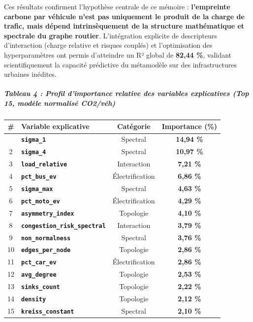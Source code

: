 \documentclass[10pt, a4paper]{article}
\newcounter{none}
\begin{document}
Ces résultats confirment l'hypothèse centrale de ce mémoire :
\textbf{l'empreinte carbone par véhicule n'est pas uniquement le produit
de la charge de trafic, mais dépend intrinsèquement de la structure
mathématique et spectrale du graphe routier}. L'intégration explicite de
descripteurs d'interaction (charge relative et risques couplés) et
l'optimisation des hyperparamètres ont permis d'atteindre un R² global
de \textbf{82,44 \%}, validant scientifiquement la capacité prédictive
du métamodèle sur des infrastructures urbaines inédites.

\subparagraph{Tableau 4 : Profil d'importance relative des variables
explicatives (Top 15, modèle normalisé
CO2/véh)}\label{tableau-4-profil-dimportance-relative-des-variables-explicatives-top-15-moduxe8le-normalisuxe9-co2vuxe9h}

{\def\LTcaptype{none} %
\begin{longtable}[]{@{}clcc@{}}
\toprule\noalign{}
\# & Variable explicative & Catégorie & Importance (\%) \\
\midrule\noalign{}
\endhead
\bottomrule\noalign{}
\endlastfoot
1 & \textbf{\texttt{sigma\_1}} & Spectral & \textbf{14,94 \%} \\
2 & \textbf{\texttt{sigma\_4}} & Spectral & \textbf{10,97 \%} \\
3 & \textbf{\texttt{load\_relative}} & Interaction & \textbf{7,21 \%} \\
4 & \textbf{\texttt{pct\_bus\_ev}} & Électrification & \textbf{6,86
\%} \\
5 & \textbf{\texttt{sigma\_max}} & Spectral & \textbf{4,63 \%} \\
6 & \textbf{\texttt{pct\_moto\_ev}} & Électrification & \textbf{4,29
\%} \\
7 & \textbf{\texttt{asymmetry\_index}} & Topologie & \textbf{4,10 \%} \\
8 & \textbf{\texttt{congestion\_risk\_spectral}} & Interaction &
\textbf{3,79 \%} \\
9 & \textbf{\texttt{non\_normalness}} & Spectral & \textbf{3,76 \%} \\
10 & \textbf{\texttt{edges\_per\_node}} & Topologie & \textbf{2,86
\%} \\
11 & \textbf{\texttt{pct\_car\_ev}} & Électrification & \textbf{2,86
\%} \\
12 & \textbf{\texttt{avg\_degree}} & Topologie & \textbf{2,53 \%} \\
13 & \textbf{\texttt{sinks\_count}} & Topologie & \textbf{2,22 \%} \\
14 & \textbf{\texttt{density}} & Topologie & \textbf{2,12 \%} \\
15 & \textbf{\texttt{kreiss\_constant}} & Spectral & \textbf{2,10 \%} \\
\end{longtable}
}
\end{document}
